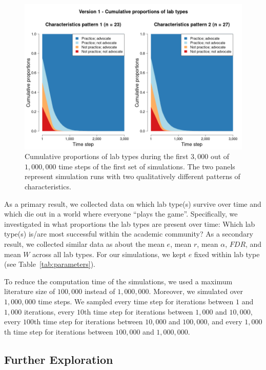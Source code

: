 \documentclass[meta, authordate]{jote-new-article}
\begin{document}
\begin{figure}[!t]
  \begin{fullwidth}
    \centering
    \includegraphics[width=\textwidth]{v1_pro_plot_main.png}
    \caption{Cumulative proportions of lab types during the first $3,000$ out of $1,000,000$ time steps of the first set of simulations. The two panels represent simulation runs with two qualitatively different patterns of characteristics.}
    \label{fig:v1_pro_plot_main}
  \end{fullwidth}
\end{figure}

As a primary result, we collected data on which lab type(s) survive over time and which die out in a world where everyone ``plays the game''. Specifically, we investigated in what proportions the lab types are present over time: Which lab type(s) is/are most successful within the academic community? As a secondary result, we collected similar data as \textcite{SmaldinoMcelreath2016} about the mean $e$, mean $r$, mean $\alpha$, $FDR$, and mean $W$ across all lab types. For our simulations, we kept $e$ fixed within lab type (see Table~\ref{tab:parameters}).

To reduce the computation time of the simulations, we used a maximum literature size of $100,000$ instead of $1,000,000$. Moreover, we simulated over $1,000,000$ time steps. We sampled every time step for iterations between $1$ and $1,000$ iterations, every $10$th time step for iterations between $1,000$ and $10,000$, every $100$th time step for iterations between $10,000$ and $100,000$, and every $1,000$th time step for iterations between $100,000$ and $1,000,000$.

\subsection{Further Exploration}
\end{document}
